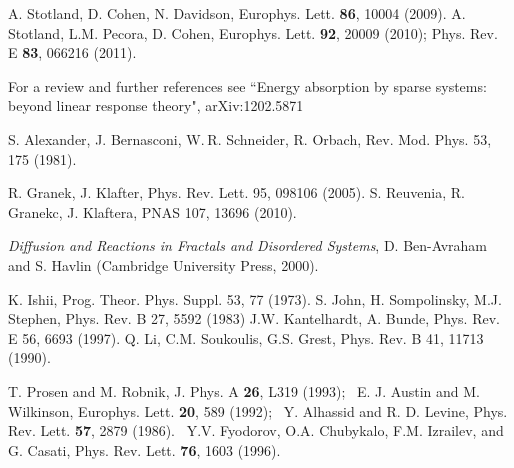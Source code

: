 \documentclass[onecolumn,fleqn,12pt,openany,draft]{book}
\begin{document}
\begin{thebibliography}{99}
%
A. Stotland, D. Cohen, N. Davidson, 
Europhys. Lett. {\bf 86}, 10004 (2009).
%
A. Stotland, L.M. Pecora, D. Cohen, 
Europhys. Lett. {\bf 92}, 20009 (2010);
Phys. Rev. E {\bf 83}, 066216 (2011).


For a review and further references 
see ``Energy absorption by sparse systems: 
beyond linear response theory",	arXiv:1202.5871  


S. Alexander, J. Bernasconi, W. R. Schneider, R. Orbach, 
Rev. Mod. Phys. 53, 175 (1981).

R. Granek, J. Klafter, Phys. Rev. Lett. 95, 098106 (2005).
S. Reuvenia, R. Granekc, J. Klaftera, PNAS 107, 13696 (2010).

{\em Diffusion and Reactions in Fractals and Disordered Systems},
D. Ben-Avraham and S. Havlin (Cambridge University Press, 2000).

K. Ishii, 
Prog. Theor. Phys. Suppl. 53, 77 (1973).
%
%
S. John, H. Sompolinsky, M.J. Stephen,  
Phys. Rev. B 27, 5592 (1983) 
%
%
J.W. Kantelhardt, A. Bunde, 
Phys. Rev. E 56, 6693 (1997).
%
%
Q. Li, C.M. Soukoulis, G.S. Grest,
Phys. Rev. B 41, 11713 (1990).  


T. Prosen and M. Robnik, J. Phys. A {\bf 26}, L319 (1993); \
E. J. Austin and M. Wilkinson, Europhys. Lett. {\bf 20}, 589 (1992); \ 
Y. Alhassid and R. D. Levine, Phys. Rev. Lett. {\bf 57}, 2879 (1986). \
Y.V. Fyodorov, O.A. Chubykalo, F.M. Izrailev, and G. Casati, 
Phys. Rev. Lett. {\bf 76}, 1603 (1996).


\end{thebibliography}




 



\ \\ \ \\ \ \\ \ \\ \ \\ \ \\ 
\end{document}
